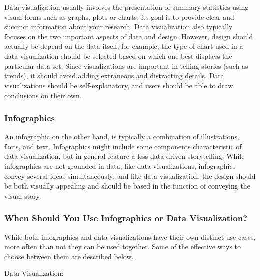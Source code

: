 \documentclass[]{book}
\theoremstyle{definition}
\theoremstyle{definition}
\theoremstyle{definition}
\theoremstyle{remark}
\begin{document}
Data visualization usually involves the presentation of summary
statistics using visual forms such as graphs, plots or charts; its goal
is to provide clear and succinct information about your research. Data
visualization also typically focuses on the two important aspects of
data and design. However, design should actually be depend on the data
itself; for example, the type of chart used in a data visualization
should be selected based on which one best displays the particular data
set. Since visualizations are important in telling stories (such as
trends), it should avoid adding extraneous and distracting details. Data
visualizations should be self-explanatory, and users should be able to
draw conclusions on their own.

\subsubsection{Infographics}\label{infographics}

An infographic on the other hand, is typically a combination of
illustrations, facts, and text. Infographics might include some
components characteristic of data visualization, but in general feature
a less data-driven storytelling. While infographics are not grounded in
data, like data visualizations, infographics convey several ideas
simultaneously; and like data visualization, the design should be both
visually appealing and should be based in the function of conveying the
visual story.

\subsubsection{When Should You Use Infographics or Data
Visualization?}\label{when-should-you-use-infographics-or-data-visualization}

While both infographics and data visualizations have their own distinct
use cases, more often than not they can be used together. Some of the
effective ways to choose between them are described below.

Data Visualization:
\end{document}
